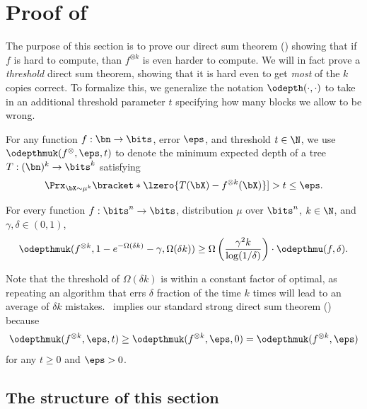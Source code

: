 \section{Proof of~}
The purpose of this section is to prove our direct sum theorem () showing that if $f$ is hard to compute, than $f^{\otimes k}$ is even harder to compute. We will in fact prove a {\sl threshold} direct sum theorem, showing that it is hard even to get {\sl most} of the $k$ copies correct. To formalize this, we generalize the notation $\odepth(\cdot, \cdot)$ to take in an additional threshold parameter $t$ specifying how many blocks we allow to be wrong.
\begin{definition}
    \label{def:threshold-DPT}
    For any function $f:\bn \to \bits$, error $\eps$, and threshold $t \in \N$, we use $\odepthmuk(f^{\otimes}, \eps, t)$ to denote the minimum expected depth of a tree $T:(\bn)^k \to \bits^k$ satisfying
    \begin{equation*}
        \Prx_{\bX \sim \mu^k}\bracket*{\lzero{T(\bX) - f^{\otimes k}(\bX)}] > t} \leq \eps.
    \end{equation*}
\end{definition}

\begin{theorem}
    \label{thm:threshold-DPT}
    For every function $f:\bits^n \to \bits$, distribution $\mu$ over $\bits^n$, $k \in \N$, and $\gamma, \delta \in (0,1)$,
    \begin{equation*}
        \odepthmuk(f^{\otimes k}, 1 - e^{-\Omega(\delta k)} - \gamma, \Omega(\delta k)) \geq \Omega\left( \frac{\gamma^2 k}{\log(1/\delta)}\right) \cdot \odepthmu(f,\delta).
    \end{equation*}
\end{theorem}
Note that the threshold of $\Omega(\delta k)$ is within a constant factor of optimal, as repeating an algorithm that errs $\delta$ fraction of the time $k$ times will lead to an average of $\delta k$ mistakes.~ implies our standard strong direct sum theorem () because \[ \odepthmuk(f^{\otimes k}, \eps, t) \geq \odepthmuk(f^{\otimes k}, \eps, 0) = \odepthmuk(f^{\otimes k}, \eps)\]  for any $t \geq 0$ and $\eps > 0$. 


\subsection{The structure of this section}

